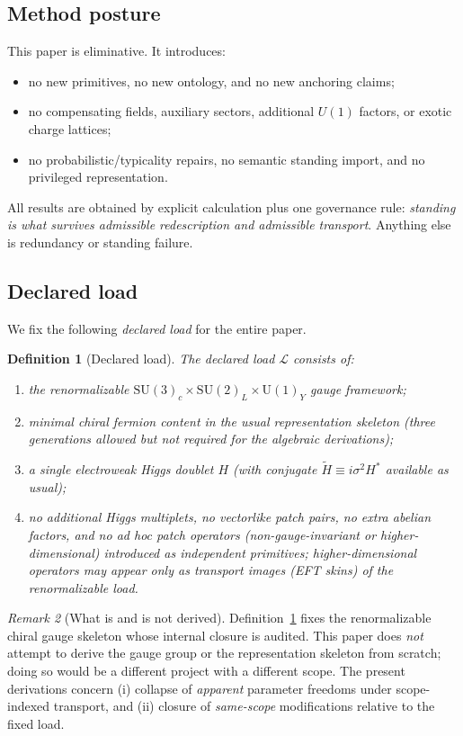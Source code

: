 \documentclass[11pt]{article}
\newtheorem{definition}{Definition}[section]
\theoremstyle{remark}
\newtheorem{remark}[definition]{Remark}
\newcommand{\SU}{\ensuremath{\mathrm{SU}}}
\newcommand{\U}{\ensuremath{\mathrm{U}}}
\newcommand{\Load}{\mathcal{L}}
\begin{document}
\subsection{Method posture}
This paper is eliminative. It introduces:
\begin{itemize}[leftmargin=2.2em]
\item no new primitives, no new ontology, and no new anchoring claims;
\item no compensating fields, auxiliary sectors, additional $U(1)$ factors, or exotic charge lattices;
\item no probabilistic/typicality repairs, no semantic standing import, and no privileged representation.
\end{itemize}
All results are obtained by explicit calculation plus one governance rule: \emph{standing is what
survives admissible redescription and admissible transport}. Anything else is redundancy or standing failure.

\subsection{Declared load}
We fix the following \emph{declared load} for the entire paper.

\begin{definition}[Declared load]\label{def:declared-load}
The declared load $\Load$ consists of:
\begin{enumerate}[label=(\roman*),leftmargin=2.2em]
\item the renormalizable $\SU(3)_c\times \SU(2)_L\times \U(1)_Y$ gauge framework;
\item minimal chiral fermion content in the usual representation skeleton (three generations allowed but
not required for the algebraic derivations);
\item a single electroweak Higgs doublet $H$ (with conjugate $\tilde H \equiv i\sigma^2 H^\ast$ available
as usual);
\item no additional Higgs multiplets, no vectorlike patch pairs, no extra abelian factors, and no
\emph{ad hoc} patch operators (non-gauge-invariant or higher-dimensional) introduced as independent
primitives; higher-dimensional operators may appear only as \emph{transport images} (EFT skins) of the
renormalizable load.
\end{enumerate}
\end{definition}

\begin{remark}[What is and is not derived]\label{rem:not-derive-gauge}
Definition~\ref{def:declared-load} fixes the renormalizable chiral gauge skeleton whose internal closure is
audited. This paper does \emph{not} attempt to derive the gauge group or the representation skeleton from
scratch; doing so would be a different project with a different scope.
The present derivations concern (i) collapse of \emph{apparent} parameter freedoms under scope-indexed
transport, and (ii) closure of \emph{same-scope} modifications relative to the fixed load.
\end{remark}
\end{document}
